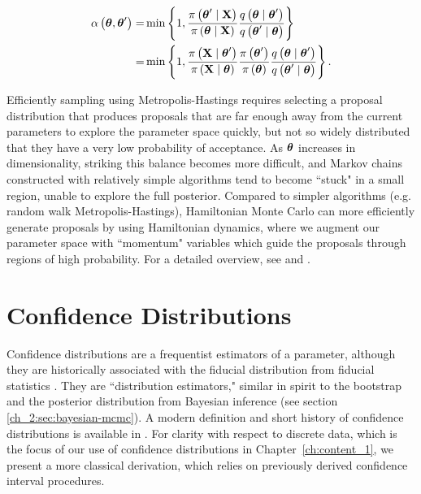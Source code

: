 \begin{align}
\alpha \left( \boldsymbol{\theta}, \boldsymbol{\theta}^\prime \right)   =&   \min \left\{ 1, \frac{\pi \left( \boldsymbol{\theta}^\prime \mid \mathbf{X} \right)}{\pi \left( \boldsymbol{\theta} \mid \mathbf{X} \right)} \frac{q \left( \boldsymbol{\theta} \mid \boldsymbol{\theta}^\prime \right)}{q \left( \boldsymbol{\theta}^\prime \mid \boldsymbol{\theta}  \right)} \right\}    \\
=&  \min \left\{ 1, \frac{\pi \left( \mathbf{X} \mid \boldsymbol{\theta}^\prime  \right)}{\pi \left( \mathbf{X} \mid \boldsymbol{\theta} \right)} \frac{\pi \left( \boldsymbol{\theta}^\prime \right)}{\pi \left( \boldsymbol{\theta} \right)} \frac{q \left( \boldsymbol{\theta} \mid \boldsymbol{\theta}^\prime \right)}{q \left( \boldsymbol{\theta}^\prime \mid \boldsymbol{\theta}  \right)} \right\}.
\end{align}

Efficiently sampling using Metropolis-Hastings requires selecting a proposal distribution that produces proposals that are far enough away from the current parameters to explore the parameter space quickly, but not so widely distributed that they have a very low probability of acceptance.
As \( \boldsymbol{\theta} \) increases in dimensionality, striking this balance becomes more difficult, and Markov chains constructed with relatively simple algorithms tend to become ``stuck" in a small region, unable to explore the full posterior.
Compared to simpler algorithms (e.g. random walk Metropolis-Hastings), Hamiltonian Monte Carlo can more efficiently generate proposals by using Hamiltonian dynamics, where we augment our parameter space with ``momentum" variables which guide the proposals through regions of high probability.
For a detailed overview, see \citet{betancourt2018conceptual} and \citet{neal2011mcmc}.

\section{Confidence Distributions}
\label{ch_2:sec:confidence_distributions}
Confidence distributions are a frequentist estimators of a parameter, although they are historically associated with the fiducial distribution from fiducial statistics \citep{Xie2013}.
They are ``distribution estimators," similar in spirit to the bootstrap and the posterior distribution from Bayesian inference (see section \ref{ch_2:sec:bayesian-mcmc}).
A modern definition and short history of confidence distributions is available in \citet{Xie2013}.
For clarity with respect to discrete data, which is the focus of our use of confidence distributions in Chapter~\ref{ch:content_1}, we present a more classical derivation, which relies on previously derived confidence interval procedures.


